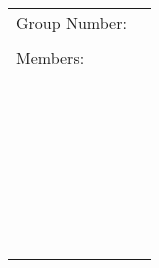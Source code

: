 \documentclass[
  course = {{MATH102 Calculus II}},
  quartile = {{2}},
  assignment = 2 - Wednesday,
  firstexercise = 1,
  term = 202
]{aga-homework}
\begin{document}

\begin{center}
  {\large
  \begin{tabular}{|l|l|}
    \hline
    Group Number: & \hspace{3in} \\
     &  \\ \hline
    Members: &  \\
        &  \\ \cline{2-2}
        &  \\
        &  \\ \cline{2-2}
        &  \\
        &  \\ \cline{2-2}
        &  \\
        &  \\ \cline{2-2}
        &  \\
        &  \\ \cline{2-2}
        &  \\
        &  \\ \cline{2-2}
        &  \\
        &  \\ \cline{2-2}
        &  \\
        &  \\ \cline{2-2}
        &  \\
        &  \\ \cline{2-2}
        &  \\
        &  \\ \cline{2-2}
        &  \\
        &  \\ \cline{2-2}
        &  \\
        &  \\ \cline{2-2}
        &  \\
        &  \\ \cline{2-2}
        &  \\
        &  \\ \cline{2-2}
        &  \\
        &  \\ \cline{2-2}
        &  \\
        &  \\
    \hline
  \end{tabular}
  }
\end{center}
\end{document}
